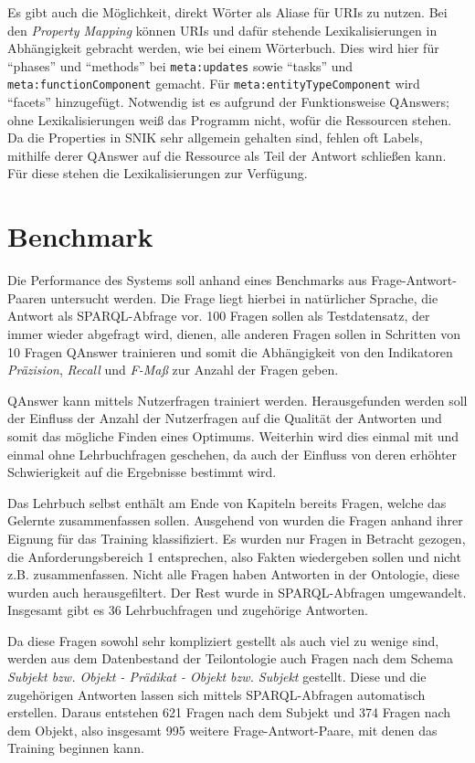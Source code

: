 \documentclass[utf8,biblatex]{lni}
\begin{document}
Es gibt auch die Möglichkeit, direkt Wörter als Aliase für URIs zu nutzen.
Bei den \emph{Property Mapping} können URIs und dafür stehende Lexikalisierungen in Abhängigkeit gebracht werden, wie bei einem Wörterbuch.
Dies wird hier für \enquote{phases} und \enquote{methods} bei \texttt{meta:updates} sowie \enquote{tasks} und \texttt{meta:functionComponent} gemacht.
Für \texttt{meta:entityTypeComponent} wird \enquote{facets} hinzugefügt.
Notwendig ist es aufgrund der Funktionsweise QAnswers; ohne Lexikalisierungen weiß das Programm nicht, wofür die Ressourcen stehen.
Da die Properties in SNIK sehr allgemein gehalten sind, fehlen oft Labels, mithilfe derer QAnswer auf die Ressource als Teil der Antwort schließen kann.
Für diese stehen die Lexikalisierungen zur Verfügung.

\section{Benchmark}

Die Performance des Systems soll anhand eines Benchmarks aus Frage-Antwort-Paaren untersucht werden.
Die Frage liegt hierbei in natürlicher Sprache, die Antwort als SPARQL-Abfrage vor.
100 Fragen sollen als Testdatensatz, der immer wieder abgefragt wird, dienen,
alle anderen Fragen sollen in Schritten von 10 Fragen QAnswer trainieren und somit die Abhängigkeit von den Indikatoren \emph{Präzision}, \emph{Recall} und \emph{F-Maß} zur Anzahl der Fragen geben.

QAnswer kann mittels Nutzerfragen trainiert werden.
Herausgefunden werden soll der Einfluss der Anzahl der Nutzerfragen auf die Qualität der Antworten und somit das mögliche Finden eines Optimums.
Weiterhin wird dies einmal mit und einmal ohne Lehrbuchfragen geschehen, da auch der Einfluss von deren erhöhter Schwierigkeit auf die Ergebnisse bestimmt wird.

Das Lehrbuch selbst \cite{bb} enthält am Ende von Kapiteln bereits Fragen, welche das Gelernte zusammenfassen sollen.
Ausgehend von \cite{arneba} wurden die Fragen anhand ihrer Eignung für das Training klassifiziert.
Es wurden nur Fragen in Betracht gezogen, die Anforderungsbereich 1 entsprechen, also Fakten wiedergeben sollen und nicht z.B. zusammenfassen.
Nicht alle Fragen haben Antworten in der Ontologie, diese wurden auch herausgefiltert.
Der Rest wurde in SPARQL-Abfragen umgewandelt.
Insgesamt gibt es 36 Lehrbuchfragen und zugehörige Antworten.

Da diese Fragen sowohl sehr kompliziert gestellt als auch viel zu wenige sind, werden aus dem Datenbestand der Teilontologie auch Fragen nach dem Schema \emph{Subjekt bzw. Objekt - Prädikat - Objekt bzw. Subjekt} gestellt.
Diese und die zugehörigen Antworten lassen sich mittels SPARQL-Abfragen automatisch erstellen.
Daraus entstehen 621 Fragen nach dem Subjekt und 374 Fragen nach dem Objekt, also insgesamt 995 weitere Frage-Antwort-Paare, mit denen das Training beginnen kann.
\end{document}
